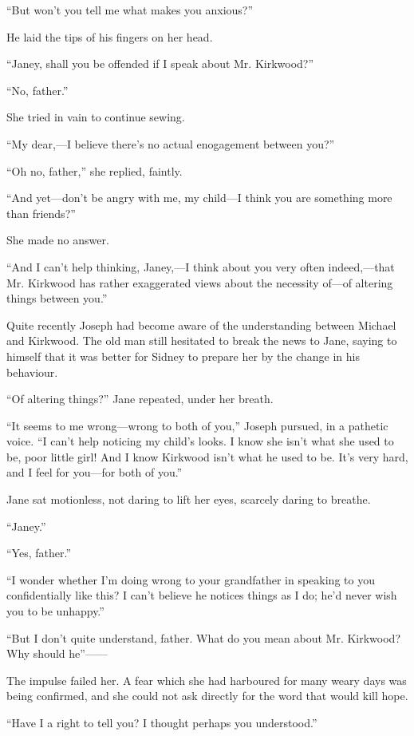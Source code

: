 {\protect\hypertarget{124}{}{}}``But won't you tell me what makes you
anxious?''

He laid the tips of his fingers on her head.

``Janey, shall you be offended if I speak about Mr. Kirkwood?''

``No, father.''

She tried in vain to continue sewing.

``My dear,---I believe there's no actual enogagement between you?''

``Oh no, father,'' she replied, faintly.

``And yet---don't be angry with me, my child---I think you are something
more than friends?''

She made no answer.

``And I can't help thinking, Janey,---I think about you very often
indeed,---that Mr. Kirkwood has rather exaggerated views about the
necessity of---of altering things between you.''

Quite recently Joseph had become aware of the understanding between
Michael and Kirkwood. The old man still hesitated to break the news to
Jane, saying to himself that it was better for Sidney to prepare her by
the change in his behaviour.

``Of altering things?'' Jane repeated, under her breath.

{\protect\hypertarget{125}{}{}}``It seems to me wrong---wrong to both of
you,'' Joseph pursued, in a pathetic voice. ``I can't help noticing my
child's looks. I know she isn't what she used to be, poor little girl!
And I know Kirkwood isn't what he used to be. It's very hard, and I feel
for you---for both of you.''

Jane sat motionless, not daring to lift her eyes, scarcely daring to
breathe.

``Janey.''

``Yes, father.''

``I wonder whether I'm doing wrong to your grandfather in speaking to
you confidentially like this? I can't believe he notices things as I do;
he'd never wish you to be unhappy.''

``But I don't quite understand, father. What do you mean about Mr.
Kirkwood? Why should he''{{------}}

The impulse failed her. A fear which she had harboured for many weary
days was being confirmed, and she could not ask directly for the word
that would kill hope.

``Have I a right to tell you? I thought perhaps you understood.''


